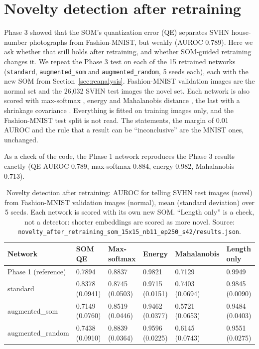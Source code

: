 \documentclass[11pt]{article}
\begin{document}
\section{Novelty detection after retraining}\label{sec:novelty_after}

Phase 3 showed that the SOM's quantization error (QE) separates SVHN house-number photographs \parencite{netzer2011reading} from Fashion-MNIST, but weakly (AUROC 0.789). Here we ask whether that still holds after retraining, and whether SOM-guided retraining changes it. We repeat the Phase 3 test on each of the 15 retrained networks (\texttt{standard}, \texttt{augmented\_som} and \texttt{augmented\_random}, 5 seeds each), each with the new SOM from Section~\ref{sec:reanalysis}. Fashion-MNIST validation images are the normal set and the 26{,}032 SVHN test images the novel set. Each network is also scored with max-softmax \parencite{hendrycks2017baseline}, energy \parencite{liu2020energy} and Mahalanobis distance \parencite{lee2018mahalanobis}, the last with a shrinkage covariance \parencite{ledoit2004wellconditioned}. Everything is fitted on training images only, and the Fashion-MNIST test split is not read. The statements, the margin of 0.01 AUROC and the rule that a result can be ``inconclusive'' \parencite{walker2011noninferiority} are the MNIST ones, unchanged.

As a check of the code, the Phase 1 network reproduces the Phase 3 results exactly (QE AUROC 0.789, max-softmax 0.884, energy 0.982, Mahalanobis 0.713).

\begin{table}[H]
\centering
\renewcommand{\arraystretch}{1.1}
\footnotesize
\begin{tabular}{|l|C{0.13\textwidth}|C{0.13\textwidth}|C{0.13\textwidth}|C{0.13\textwidth}|C{0.13\textwidth}|}
\hline
\textbf{Network} & \textbf{SOM QE} & \textbf{Max-softmax} & \textbf{Energy} & \textbf{Mahalanobis} & \textbf{Length only} \\ \hline
Phase 1 (reference) & 0.7894 & 0.8837 & 0.9821 & 0.7129 & 0.9949 \\ \hline
standard & 0.8378 (0.0941) & 0.8745 (0.0503) & 0.9715 (0.0151) & 0.7403 (0.0694) & 0.9845 (0.0090) \\ \hline
augmented\_som & 0.7149 (0.0760) & 0.8519 (0.0446) & 0.9462 (0.0377) & 0.5721 (0.0653) & 0.9484 (0.0403) \\ \hline
augmented\_random & 0.7438 (0.0910) & 0.8839 (0.0364) & 0.9596 (0.0225) & 0.6145 (0.0743) & 0.9551 (0.0275) \\ \hline
\end{tabular}
\caption{Novelty detection after retraining: AUROC for telling SVHN test images (novel) from Fashion-MNIST validation images (normal), mean (standard deviation) over 5 seeds. Each network is scored with its own new SOM. ``Length only'' is a check, not a detector: shorter embeddings are scored as more novel. Source: \texttt{novelty\_after\_retraining\_som\_15x15\_nb11\_ep250\_s42/results.json}.}
\label{tab:novelty_after}
\end{table}
\end{document}
